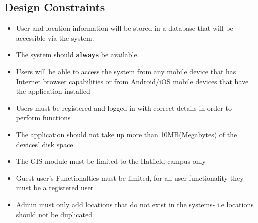 
\subsection{Design Constraints}
\begin{itemize}
    \item User and location information will be stored in a database that will be accessible via the system.
    \item The system should \textbf{always} be available.
    \item Users will be able to access the system from any mobile device that has Internet browser capabilities or from Android/iOS mobile devices that have the application installed
    \item Users must be registered and logged-in with correct details in order to perform functions
    \item The application should not take up more than 10MB(Megabytes) of the devices' disk space
    \item The GIS module must be limited to the Hatfield campus only
    \item Guest user's Functionalties must be limited, for all user functionality they must be a registered user
    \item Admin must only add locations that do not exist in the systems- i.e locations should not be duplicated
    
\end{itemize}
